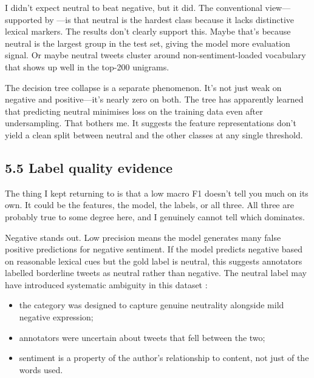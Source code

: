 \documentclass[12pt]{article}
\begin{document}
I didn't expect neutral to beat negative, but it did.
The conventional view---supported by \citet{kenyondean2018sentiment}---is that neutral is the hardest class because it lacks distinctive lexical markers.
The results don't clearly support this.
Maybe that's because neutral is the largest group in the test set, giving the model more evaluation signal.
Or maybe neutral tweets cluster around non-sentiment-loaded vocabulary that shows up well in the top-200 unigrams.

The decision tree collapse is a separate phenomenon.
It's not just weak on negative and positive---it's nearly zero on both.
The tree has apparently learned that predicting neutral minimises loss on the training data even after undersampling.
That bothers me.
It suggests the feature representations don't yield a clean split between neutral and the other classes at any single threshold.



\subsection*{5.5 Label quality evidence}



The thing I kept returning to is that a low macro F1 doesn't tell you much on its own.
It could be the features, the model, the labels, or all three.
All three are probably true to some degree here, and I genuinely cannot tell which dominates.

Negative stands out. Low precision means the model generates many false positive predictions for negative sentiment. If the model predicts negative based on reasonable lexical cues but the gold label is neutral, this suggests annotators labelled borderline tweets as neutral rather than negative. The neutral label may have introduced systematic ambiguity in this dataset \citep{kenyondean2018sentiment}:

\begin{itemize}

  \item the category was designed to capture genuine neutrality alongside mild negative expression;

  \item annotators were uncertain about tweets that fell between the two;

  \item sentiment is a property of the author's relationship to content, not just of the words used.

\end{itemize}
\end{document}
